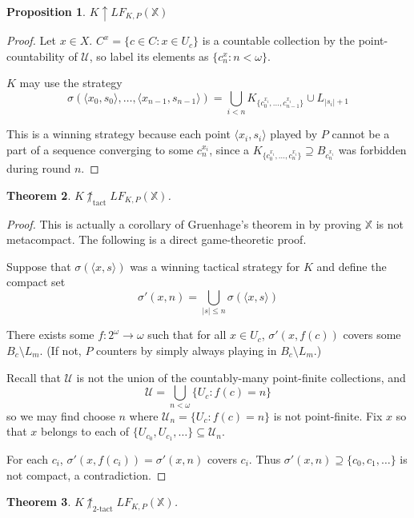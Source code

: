 \documentclass[11pt]{article}
\theoremstyle{plain}
\newtheorem{theorem}{Theorem}
\newtheorem{proposition}[theorem]{Proposition}
\theoremstyle{definition}
\theoremstyle{remark}
\newcommand{\win}{\uparrow}
\newcommand{\tactwin}{\uparrow_{\text{tact}}}
\newcommand{\ktactwin}[1]{\uparrow_{#1\text{-tact}}}
\newcommand{\lfkpgame}[1]{LF_{K,P}(#1)}
\newcommand{\<}{\langle}
\renewcommand{\>}{\rangle}
\begin{document}
\begin{proposition}
$K \win \lfkpgame{\mathbb{X}}$
\end{proposition}

\begin{proof}
Let $x\in X$. $C^x = \{c \in C : x \in U_c\}$ is a countable collection by the point-countability of $\mathcal{U}$, so label its elements as $\{c^x_n: n<\omega\}$.

$K$ may use the strategy 
  \[
    \sigma(\<x_0,s_0\>,\dots,\<x_{n-1},s_{n-1}\>) = 
    \bigcup_{i < n} K_{\{c^{x_i}_0,\dots,c^{x_i}_{n-1}\}} \cup L_{|s_i|+1}
  \]

This is a winning strategy because each point $\<x_i,s_i\>$ played by $P$ cannot be a part of a sequence converging to some $c^{x_i}_n$, since a $K_{\{c^{x_i}_0,\dots,c^{x_i}_n\}} \supseteq B_{c^{x_i}_n}$ was forbidden during round $n$.
\end{proof}

\begin{theorem}
$K\not\tactwin\lfkpgame{\mathbb{X}}$.
\end{theorem}

\begin{proof}
This is actually a corollary of Gruenhage's theorem in \cite{G2} by proving $\mathbb{X}$ is not metacompact. The following is a direct game-theoretic proof.

Suppose that $\sigma(\<x,s\>)$ was a winning tactical strategy for $K$ and define the compact set 
  \[
    \sigma'(x,n) = \bigcup_{|s|\leq n} \sigma(\<x,s\>)
  \]

There exists some $f: 2^\omega \to \omega$ such that for all $x\in U_c$, $\sigma'(x,f(c))$ covers some $B_c \setminus L_m$. (If not, $P$ counters by simply always playing in $B_c \setminus L_m$.)

Recall that $\mathcal{U}$ is not the union of the countably-many point-finite collections, and 
  \[
    \mathcal{U} = \bigcup_{n<\omega} \{U_c : f(c) = n\}
  \]
so we may find choose $n$ where $\mathcal{U}_n = \{U_c : f(c) = n\}$ is not point-finite. Fix $x$ so that $x$ belongs to each of $\{U_{c_0},U_{c_1},\dots\} \subseteq \mathcal{U}_n$.

For each $c_i$, $\sigma'(x,f(c_i))=\sigma'(x,n)$ covers $c_i$. Thus $\sigma'(x,n) \supseteq \{c_0,c_1,\dots\}$ is not compact, a contradiction.
\end{proof}

\newpage

\begin{theorem}
$K\not\ktactwin{2}\lfkpgame{\mathbb{X}}$.
\end{theorem}
\end{document}
